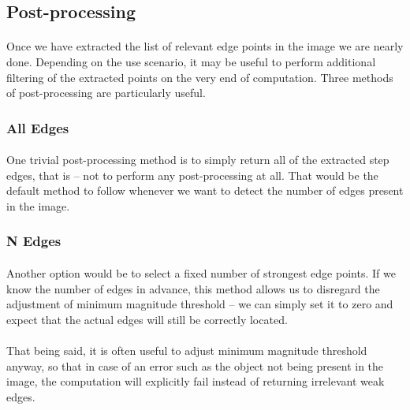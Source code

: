 \subsection{Post-processing}

\paragraph*{}
Once we have extracted the list of relevant edge points in the image we are nearly done. Depending on the use scenario, it may be useful to perform additional filtering of the extracted points on the very end of computation. Three methods of post-processing are particularly useful.

\subsubsection{All Edges}
\paragraph*{}
One trivial post-processing method is to simply return all of the extracted step edges, that is -- not to perform any post-processing at all. That would be the default method to follow whenever we want to detect the number of edges present in the image.

\subsubsection{N Edges}
\paragraph*{}
Another option would be to select a fixed number of strongest edge points. If we know the number of edges in advance, this method allows us to disregard the adjustment of minimum magnitude threshold -- we can simply set it to zero and expect that the actual edges will still be correctly located. 

\paragraph*{}
That being said, it is often useful to adjust minimum magnitude threshold anyway, so that in case of an error such as the object not being present in the image, the computation will explicitly fail instead of returning irrelevant weak edges. 

